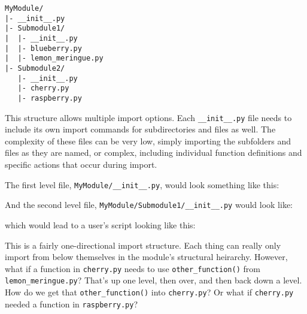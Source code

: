 \begin{verbatim}
MyModule/
|- __init__.py
|- Submodule1/
|  |- __init__.py
|  |- blueberry.py
|  |- lemon_meringue.py
|- Submodule2/
   |- __init__.py
   |- cherry.py
   |- raspberry.py
\end{verbatim}

This structure allows multiple import options. Each
\texttt{\_\_init\_\_.py} file needs to include its own import commands
for subdirectories and files as well. The complexity of these files can
be very low, simply importing the subfolders and files as they are
named, or complex, including individual function definitions and
specific actions that occur during import.

The first level file, \texttt{MyModule/\_\_init\_\_.py}, would look
something like this:

\begin{Shaded}
\begin{Highlighting}[]
\end{Highlighting}
\end{Shaded}

And the second level file, \texttt{MyModule/Submodule1/\_\_init\_\_.py}
would look like:

\begin{Shaded}
\begin{Highlighting}[]
\end{Highlighting}
\end{Shaded}

which would lead to a user's script looking like this:

\begin{Shaded}
\begin{Highlighting}[]
\NormalTok{)}
\end{Highlighting}
\end{Shaded}

This is a fairly one-directional import structure. Each thing can really
only import from below themselves in the module's structural heirarchy.
However, what if a function in \texttt{cherry.py} needs to use
\texttt{other\_function()} from \texttt{lemon\_meringue.py}? That's up
one level, then over, and then back down a level. How do we get that
\texttt{other\_function()} into \texttt{cherry.py}? Or what if
\texttt{cherry.py} needed a function in \texttt{raspberry.py}?

